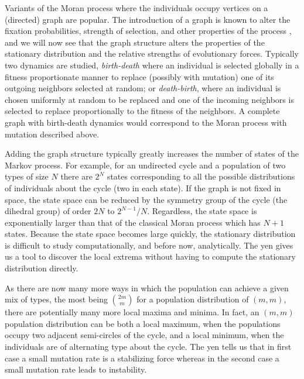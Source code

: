 \documentclass[aps,prd,11pt,notitlepage,nofootinbib,superscriptaddress,showkeys,letterpaper]{revtex4-1}
\begin{document}
Variants of the Moran process where the individuals occupy vertices on a (directed)
graph are popular. The introduction of a graph is known to alter the fixation
probabilities, strength of selection, and other properties of the process
\cite{Nowak05} \cite{RepEquOnGraphs},
and we will now see that the graph structure alters the properties of the
stationary distribution and the relative strengths of evolutionary forces. Typically
two dynamics are studied, \emph{birth-death} where an
individual is selected globally in a fitness proportionate manner to replace
(possibly with mutation) one of its outgoing neighbors selected at random; or
\emph{death-birth}, where an individual is chosen uniformly at random to be
replaced and one of the incoming neighbors is selected to replace proportionally
to the fitness of the neighbors. A complete graph with birth-death dynamics
would correspond to the Moran process with mutation described above.

Adding the graph structure typically greatly increases the number of states of
the Markov process. For example, for an undirected cycle and a population of two
types of size $N$ there are $2^N$ states corresponding to all the possible
distributions of individuals about the cycle (two in each state). If the graph
is not fixed in space, the state space can be reduced by the symmetry group of
the cycle (the dihedral group) of order $2N$ to $2^{N-1} / N$. Regardless, the
state space is exponentially larger than that of the classical Moran process which
has $N+1$ states. Because the state space becomes large quickly, the stationary
distribution is difficult to study computationally, and before now, analytically.
The yen gives us a tool to discover the local extrema without having to compute
the stationary distribution directly.

As there are now many more ways in which the population can
achieve a given mix of types, the most being $\binom{2m}{m}$ for a population
distribution of $(m, m)$, there are potentially many more local maxima and
minima. In fact, an $(m, m)$ population distribution can be both a local maximum,
when the populations occupy two adjacent semi-circles of the cycle, and a local
minimum, when the individuals are of alternating type about the cycle. The yen
tells us that in first case a small mutation rate is a stabilizing force whereas
in the second case a small mutation rate leads to instability.
\end{document}
